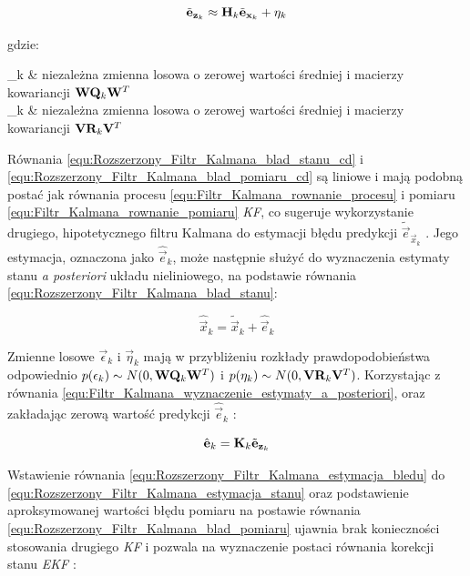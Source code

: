 \begin{equation}
\label{equ:Rozszerzony_Filtr_Kalmana_blad_pomiaru_cd}
	\tilde{\mathbf{e}}_{\mathbf{z}_k} \approx \mathbf{H}_k \tilde{\mathbf{e}}_{\mathbf{x}_k} + \mathbf{\eta}_k
\end{equation}

\noindent
gdzie:

\begin{conditions}
	\vec{\epsilon}_k & niezależna zmienna losowa o zerowej wartości średniej i macierzy kowariancji $\mathbf{W}\mathbf{Q}_k\mathbf{W}^T$ \\
	\vec{\eta}_k & niezależna zmienna losowa o zerowej wartości średniej i macierzy kowariancji $\mathbf{V}\mathbf{R}_k\mathbf{V}^T$ \\
\end{conditions}

Równania \ref{equ:Rozszerzony_Filtr_Kalmana_blad_stanu_cd} i \ref{equ:Rozszerzony_Filtr_Kalmana_blad_pomiaru_cd} są liniowe i mają podobną postać jak równania procesu \ref{equ:Filtr_Kalmana_rownanie_procesu} i pomiaru \ref{equ:Filtr_Kalmana_rownanie_pomiaru} \textit{KF}, co sugeruje wykorzystanie drugiego, hipotetycznego filtru Kalmana do estymacji błędu predykcji $\tilde{\vec{e}}_{\vec{x}_k}$ \cite{Welch1995}. Jego estymacja, oznaczona jako $\hat{\vec{e}}_k$, może następnie służyć do wyznaczenia estymaty stanu \textit{a posteriori} układu nieliniowego, na podstawie równania \ref{equ:Rozszerzony_Filtr_Kalmana_blad_stanu}:

\begin{equation}
\label{equ:Rozszerzony_Filtr_Kalmana_estymacja_stanu}
	\hat{\vec{x}}_k = \tilde{\vec{x}}_k + \hat{\vec{e}}_k
\end{equation}

Zmienne losowe $\vec{\epsilon}_k$ i $\vec{\eta}_k$ mają w przybliżeniu rozkłady prawdopodobieństwa odpowiednio $p(\mathbf{\epsilon}_k) \sim N(0, \mathbf{W}\mathbf{Q}_k\mathbf{W}^T)$ i $p(\mathbf{\eta}_k) \sim N(0, \mathbf{V}\mathbf{R}_k\mathbf{V}^T)$. Korzystając z równania \ref{equ:Filtr_Kalmana_wyznaczenie_estymaty_a_posteriori}, oraz zakładając zerową wartość predykcji $\hat{\vec{e}}_k$ \cite{Welch1995}:

\begin{equation}
\label{equ:Rozszerzony_Filtr_Kalmana_estymacja_bledu}
	\hat{\vec{e}}_k = \matr{K}_k \tilde{\vec{e}}_{\vec{z}_k}
\end{equation}

Wstawienie równania \ref{equ:Rozszerzony_Filtr_Kalmana_estymacja_bledu} do \ref{equ:Rozszerzony_Filtr_Kalmana_estymacja_stanu} oraz podstawienie aproksymowanej wartości błędu pomiaru na postawie równania \ref{equ:Rozszerzony_Filtr_Kalmana_blad_pomiaru} ujawnia brak konieczności stosowania drugiego \textit{KF} i pozwala na wyznaczenie postaci równania korekcji stanu \textit{EKF} \cite{Welch1995}:

